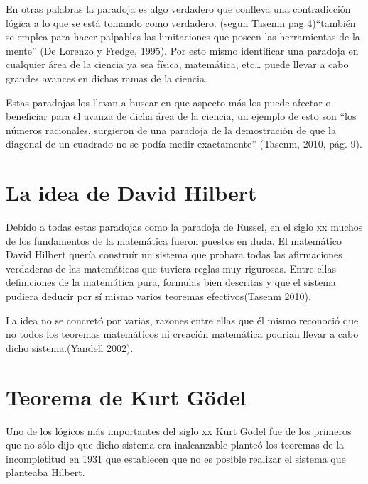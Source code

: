 \documentclass{article}
\begin{document}
\vspace{10pt}
 En otras palabras la paradoja es algo verdadero que conlleva una contradicción lógica a lo que se está tomando como verdadero. (segun Tasenm pag 4)“también se emplea para hacer palpables las limitaciones que poseen las herramientas de la mente” (De Lorenzo y Fredge, 1995). Por esto mismo identificar una paradoja en cualquier área de la ciencia ya sea física, matemática, etc… puede llevar a cabo grandes avances en dichas ramas de la ciencia.

\vspace{10pt}

Estas paradojas los llevan a buscar en que aspecto más los puede afectar o beneficiar para el avanza de dicha área de la ciencia, un ejemplo de esto son “los números racionales, surgieron de una paradoja de la demostración de  que la diagonal de un cuadrado no se podía medir exactamente” (Tasenm, 2010, pág. 9).
\vspace{10pt}

\section{La idea de David Hilbert}
Debido a todas estas paradojas como la paradoja de Russel, en el siglo xx muchos de los fundamentos de la matemática fueron puestos en duda. El matemático David Hilbert quería construír un sistema que probara todas las afirmaciones verdaderas  de las matemáticas que tuviera reglas muy rigurosas. Entre ellas definiciones de la matemática pura, formulas bien descritas y que el sistema pudiera deducir por sí mismo varios teoremas efectivos(Tasenm 2010).

\vspace{10pt}

La idea no se concretó por varias, razones entre ellas que él mismo reconoció que no todos los teoremas matemáticos ni creación matemática podrían llevar a cabo dicho sistema.(Yandell 2002).

\vspace{10pt}
\section{Teorema de Kurt Gödel}
Uno de los lógicos más importantes del siglo xx Kurt Gödel fue de los primeros que no sólo dijo que dicho sistema era inalcanzable planteó los teoremas de la incompletitud en 1931 que establecen que no es posible realizar el sistema que planteaba Hilbert.
\vspace{10pt}
\end{document}
